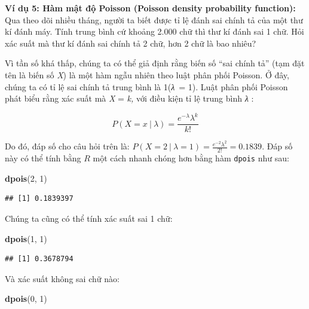 \documentclass[
]{book}
\newenvironment{Shaded}{\begin{snugshade}}{\end{snugshade}}
\newcommand{\DecValTok}[1]{\textcolor[rgb]{0.00,0.00,0.81}{#1}}
\newcommand{\KeywordTok}[1]{\textcolor[rgb]{0.13,0.29,0.53}{\textbf{#1}}}
\newcommand{\NormalTok}[1]{#1}
\begin{document}
\textbf{Ví dụ 5: Hàm mật độ Poisson (Poisson density probability function):} Qua theo dõi nhiều tháng, người ta biết được tỉ lệ đánh sai chính tả của một thư kí đánh máy. Tính trung bình cứ khoảng 2.000 chữ thì thư kí đánh sai 1 chữ. Hỏi xác suất mà thư kí đánh sai chính tả 2 chữ, hơn 2 chữ là bao nhiêu?

Vì tần số khá thấp, chúng ta có thể giả định rằng biến số ``sai chính tả'' (tạm đặt tên là biến số \emph{X}) là một hàm ngẫu nhiên theo luật phân phối Poisson. Ở đây, chúng ta có tỉ lệ sai chính tả trung bình là 1(\emph{λ}~= 1). Luật phân phối Poisson phát biểu rằng xác suất mà \emph{X} = \emph{k,} với điều kiện tỉ lệ trung bình \emph{λ} :

\[P\left( X = x\ |\ \lambda \right) = \frac{e^{- \lambda}\lambda^{k}}{k!}\]

Do đó, đáp số cho câu hỏi trên là:
\(P\left( X = 2\ |\ \lambda = 1 \right) = \frac{e^{- 2}\lambda^{2}}{2!} = 0.1839\).
Đáp số này có thể tính bằng \(R\) một cách nhanh chóng hơn bằng hàm \texttt{dpois}
như sau:

\begin{Shaded}
\begin{Highlighting}[]
\KeywordTok{dpois}\NormalTok{(}\DecValTok{2}\NormalTok{, }\DecValTok{1}\NormalTok{)}
\end{Highlighting}
\end{Shaded}

\begin{verbatim}
## [1] 0.1839397
\end{verbatim}

Chúng ta cũng có thể tính xác suất sai 1 chữ:

\begin{Shaded}
\begin{Highlighting}[]
\KeywordTok{dpois}\NormalTok{(}\DecValTok{1}\NormalTok{, }\DecValTok{1}\NormalTok{)}
\end{Highlighting}
\end{Shaded}

\begin{verbatim}
## [1] 0.3678794
\end{verbatim}

Và xác suất không sai chữ nào:

\begin{Shaded}
\begin{Highlighting}[]
\KeywordTok{dpois}\NormalTok{(}\DecValTok{0}\NormalTok{, }\DecValTok{1}\NormalTok{)}
\end{Highlighting}
\end{Shaded}
\end{document}
